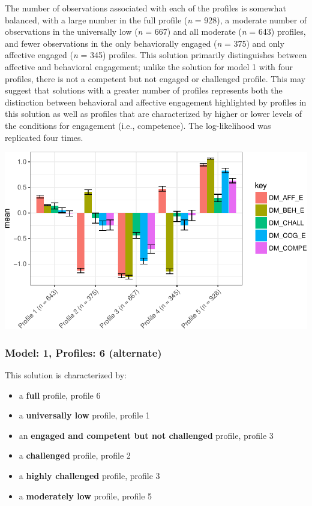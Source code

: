 \documentclass[]{book}
\providecommand{\tightlist}{%
  \setlength{\itemsep}{0pt}\setlength{\parskip}{0pt}}
\theoremstyle{definition}
\theoremstyle{definition}
\theoremstyle{definition}
\theoremstyle{remark}
\begin{document}
The number of observations associated with each of the profiles is
somewhat balanced, with a large number in the full profile (\emph{n} =
928), a moderate number of observations in the universally low (\emph{n}
= 667) and all moderate (\emph{n} = 643) profiles, and fewer
observations in the only behaviorally engaged (\emph{n} = 375) and only
affective engaged (\emph{n} = 345) profiles. This solution primarily
distinguishes between affective and behavioral engagement; unlike the
solution for model 1 with four profiles, there is not a competent but
not engaged or challenged profile. This may suggest that solutions with
a greater number of profiles represents both the distinction between
behavioral and affective engagement highlighted by profiles in this
solution as well as profiles that are characterized by higher or lower
levels of the conditions for engagement (i.e., competence). The
log-likelihood was replicated four times.

\begin{center}\includegraphics[width=0.8\linewidth]{rosenberg-dissertation_files/figure-latex/m1_5p-1} \end{center}

\subsubsection{Model: 1, Profiles: 6
(alternate)}\label{model-1-profiles-6-alternate}

This solution is characterized by:

\begin{itemize}
\tightlist
\item
  a \textbf{full} profile, profile 6
\item
  a \textbf{universally low} profile, profile 1
\item
  an \textbf{engaged and competent but not challenged} profile, profile
  3
\item
  a \textbf{challenged} profile, profile 2
\item
  a \textbf{highly challenged} profile, profile 3
\item
  a \textbf{moderately low} profile, profile 5
\end{itemize}
\end{document}
